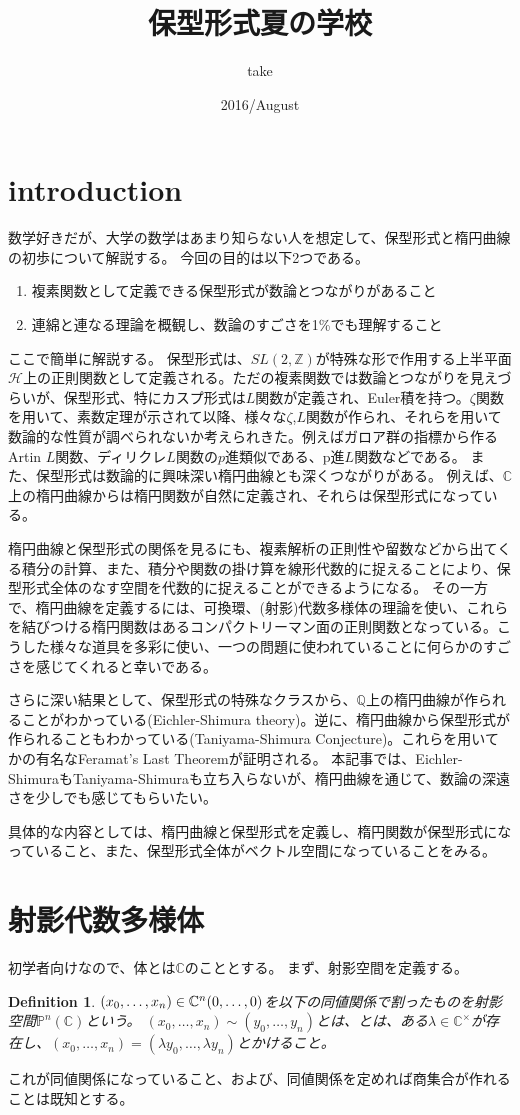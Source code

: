 \documentclass{ujarticle}
\title{保型形式夏の学校}
\author{take}
\date{2016/August}
\newtheorem{dfn}[thm]{Definition}
\begin{document}
\section{introduction}
\label{sec:introduction}
数学好きだが、大学の数学はあまり知らない人を想定して、保型形式と楕円曲線の初歩について解説する。
今回の目的は以下2つである。
\begin{enumerate}
  \item 複素関数として定義できる保型形式が数論とつながりがあること
  \item 連綿と連なる理論を概観し、数論のすごさを1\%でも理解すること
\end{enumerate}
ここで簡単に解説する。
保型形式は、$SL(2,\mathbb{Z})$が特殊な形で作用する上半平面$\mathcal{H}$上の正則関数として定義される。ただの複素関数では数論とつながりを見えづらいが、保型形式、特にカスプ形式は$L$関数が定義され、Euler積を持つ。$\zeta$関数を用いて、素数定理が示されて以降、様々な$\zeta$,$L$関数が作られ、それらを用いて数論的な性質が調べられないか考えられきた。例えばガロア群の指標から作るArtin $L$関数、ディリクレ$L$関数の$p$進類似である、p進$L$関数などである。
また、保型形式は数論的に興味深い楕円曲線とも深くつながりがある。
例えば、$\mathbb{C}$上の楕円曲線からは楕円関数が自然に定義され、それらは保型形式になっている。


楕円曲線と保型形式の関係を見るにも、複素解析の正則性や留数などから出てくる積分の計算、また、積分や関数の掛け算を線形代数的に捉えることにより、保型形式全体のなす空間を代数的に捉えることができるようになる。
その一方で、楕円曲線を定義するには、可換環、(射影)代数多様体の理論を使い、これらを結びつける楕円関数はあるコンパクトリーマン面の正則関数となっている。こうした様々な道具を多彩に使い、一つの問題に使われていることに何らかのすごさを感じてくれると幸いである。

さらに深い結果として、保型形式の特殊なクラスから、$\mathbb{Q}$上の楕円曲線が作られることがわかっている(Eichler-Shimura theory)。逆に、楕円曲線から保型形式が作られることもわかっている(Taniyama-Shimura Conjecture)。これらを用いてかの有名なFeramat's Last Theoremが証明される。
本記事では、Eichler-ShimuraもTaniyama-Shimuraも立ち入らないが、楕円曲線を通じて、数論の深遠さを少しでも感じてもらいたい。

具体的な内容としては、楕円曲線と保型形式を定義し、楕円関数が保型形式になっていること、また、保型形式全体がベクトル空間になっていることをみる。
\section{射影代数多様体}
\label{sec:射影代数多様体}

初学者向けなので、体とは$\mathbb{C}$のこととする。
まず、射影空間を定義する。
\begin{dfn}
  $(x_0,\dots,x_n) \in \mathbb{C}^n\\{(0,\dots,0)} $を以下の同値関係で割ったものを射影空間$\mathbb{P}^n(\mathbb{C})$という。
  $(x_0,\dots ,x_n) \sim (y_0,\dots,y_n)$とは、とは、ある$\lambda \in \mathbb{C}^{\times}$が存在し、$(x_0,\dots ,x_n)= (\lambda y_0,\dots, \lambda y_n)$とかけること。
\end{dfn}
これが同値関係になっていること、および、同値関係を定めれば商集合が作れることは既知とする。
\end{document}
